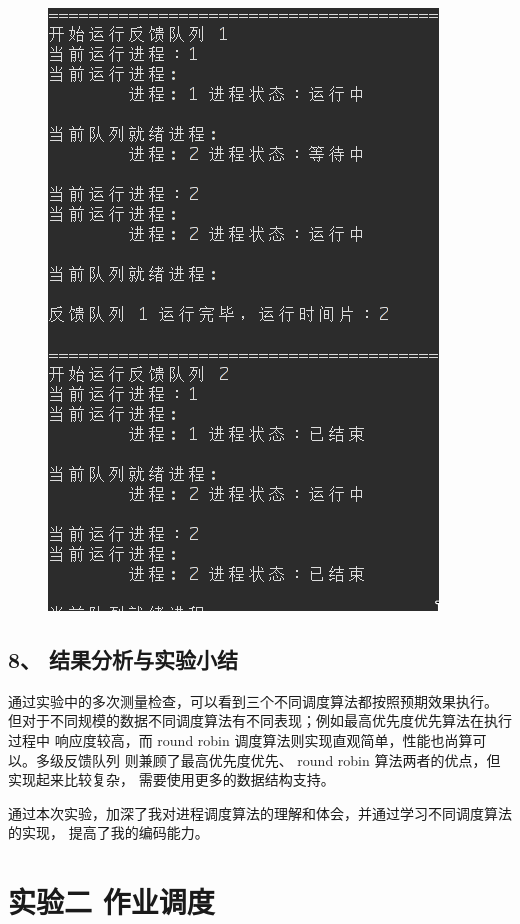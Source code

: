 \documentclass[12bp]{guo}
\begin{document}
\begin{figure}[h!]
    \centering
        \includegraphics[scale=0.75]{figures/1.multi.png}
\end{figure}


\subsection{8、 结果分析与实验小结}

通过实验中的多次测量检查，可以看到三个不同调度算法都按照预期效果执行。
但对于不同规模的数据不同调度算法有不同表现；例如最高优先度优先算法在执行过程中
响应度较高，而 round robin 调度算法则实现直观简单，性能也尚算可以。多级反馈队列
则兼顾了最高优先度优先、 round robin 算法两者的优点，但实现起来比较复杂，
需要使用更多的数据结构支持。


通过本次实验，加深了我对进程调度算法的理解和体会，并通过学习不同调度算法的实现，
提高了我的编码能力。



\clearpage

\section{实验二 作业调度}
\end{document}
